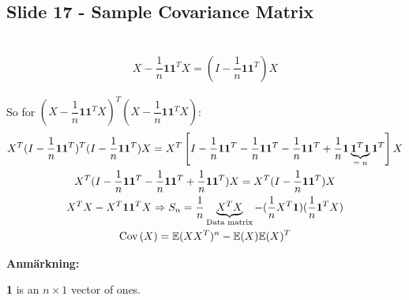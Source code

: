 \subsection{Slide 17 - Sample Covariance Matrix}\hfill\\
\begin{equation*}
  \begin{gathered}
    X-\dfrac{1}{n}\mathbf{1}\mathbf{1}^TX = (I-\dfrac{1}{n}\mathbf{1}\mathbf{1}^T)X
  \end{gathered}
\end{equation*}\par
\noindent So for $(X-\dfrac{1}{n}\mathbf{1}\mathbf{1}^TX)^T(X-\dfrac{1}{n}\mathbf{1}\mathbf{1}^TX)$:
\begin{equation*}
  \begin{gathered}
    X^T(I-\dfrac{1}{n}\mathbf{1}\mathbf{1}^T)^T(I-\dfrac{1}{n}\mathbf{1}\mathbf{1}^T)X = X^T\left[I-\dfrac{1}{n}\mathbf{1}\mathbf{1}^T-\dfrac{1}{n}\mathbf{1}\mathbf{1}^T-\dfrac{1}{n}\mathbf{1}\mathbf{1}^T+\dfrac{1}{n}\mathbf{1}\underbrace{\mathbf{1}^T\mathbf{1}}_{\text{$=n$}}\mathbf{1}^T\right]X\\
    X^T(I-\dfrac{1}{n}\mathbf{1}\mathbf{1}^T-\dfrac{1}{n}\mathbf{1}\mathbf{1}^T+\dfrac{1}{n}\mathbf{1}\mathbf{1}^T)X = X^T(I-\dfrac{1}{n}\mathbf{1}\mathbf{1}^T)X\\
    X^TX-X^T\mathbf{1}\mathbf{1}^TX\Rightarrow S_n = \dfrac{1}{n}\underbrace{X^TX}_{\text{Data matrix}}-(\dfrac{1}{n}X^T\mathbf{1})(\dfrac{1}{n}\mathbf{1}^TX)\\
    \text{Cov}\left(X\right) = \mathbb{E}(XX^T)^n-\mathbb{E}(X)\mathbb{E}(X)^T
  \end{gathered}
\end{equation*}
\par\bigskip
\noindent\textbf{Anmärkning:}\par
\noindent\textbf{1} is an $n\times 1$ vector of ones.
